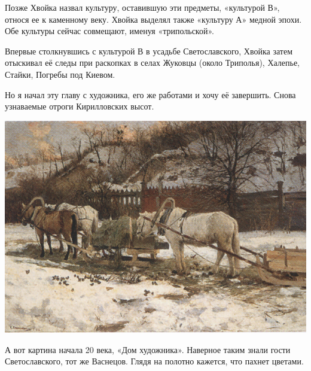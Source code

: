 Позже Хвойка назвал культуру, оставившую эти предметы, «культурой В», относя ее к каменному веку. Хвойка выделял также «культуру А» медной эпохи. Обе культуры сейчас совмещают, именуя «трипольской».

Впервые столкнувшись с культурой В в усадьбе Светославского, Хвойка затем отыскивал её следы при раскопках в селах Жуковцы (около Триполья), Халепье, Стайки, Погребы под Киевом.

Но я начал эту главу с художника, его же работами и хочу её завершить. Снова узнаваемые отроги Кирилловских высот.
\vspace*{\fill}
\begin{center}
\includegraphics[width=\linewidth]{chast-kirvys/svetosl/sveto-zima.jpg}
\end{center}
\vspace*{\fill}
\newpage

А вот картина начала 20 века, «Дом художника». Наверное таким знали гости Светославского, тот же Васнецов. Глядя на полотно кажется, что пахнет цветами.

